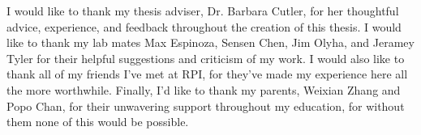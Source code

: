 

I would like to thank my thesis adviser, Dr. Barbara Cutler, for her thoughtful advice, experience, and feedback throughout the creation of this thesis. I would like to thank my lab mates Max Espinoza, Sensen Chen, Jim Olyha, and Jeramey Tyler for their helpful suggestions and criticism of my work. I would also like to thank all of my friends I've met at RPI, for they've made my experience here all the more worthwhile. Finally, I'd like to thank my parents, Weixian Zhang and Popo Chan, for their unwavering support throughout my education, for without them none of this would be possible.
